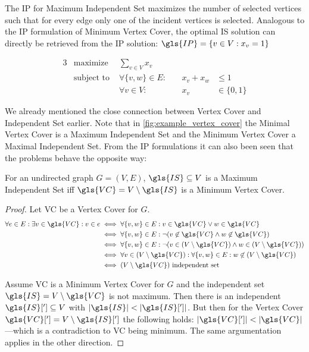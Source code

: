 The \gls{IP} for Maximum Independent Set maximizes the number of 
selected vertices such that for every edge only one of the incident 
vertices is selected. Analogous to the \gls{IP} formulation of Minimum
Vertex Cover, the optimal \gls{IS} solution can directly be retrieved 
from the \gls{IP} solution:
\( \gls{IP} = \{v \in V : x_v = 1\} \)

\begin{problem}
  \begin{alignat*}{3}
    &\text{maximize } & \sum\limits_{v \in V} x_v \\
    &\text{subject to } & \forall \{v,w\} \in E : &~& x_v + x_w &\leq 1 \\
    && \forall v \in V : &~& x_v &\in \{0,1\}
  \end{alignat*}
\end{problem}

We already mentioned the close connection between Vertex Cover and
Independent Set earlier. Note that in \cref{fig:example_vertex_cover}
the Minimal Vertex Cover is a Maximum Independent Set and the Minimum
Vertex Cover a Maximal Independent Set. From the \gls{IP} formulations
 it can also been seen that the problems behave the opposite way:

\begin{theorem}
  \label{thm:independent_set_vertex_cover}
  For an undirected graph \(G=(V,E)\), \(\gls{IS} \subseteq V\)
  is a Maximum Independent Set iff
  \(\gls{VC} = V \setminus \gls{IS}\)
  is a Minimum Vertex Cover.
\end{theorem}

\begin{proof}
  Let \gls{VC} be a Vertex Cover for \(G\). 
  \begin{alignat*}{1}
    \forall e \in E : \exists v \in \gls{VC} : v \in e
    &\iff \forall \{v,w\} \in E :
      v \in \gls{VC} \lor w \in \gls{VC} \\
    &\iff \forall \{v, w\} \in E :
      \lnot(v \not\in \gls{VC} \land w \not\in \gls{VC}) \\
    &\iff \forall \{v, w\} \in E :
      \lnot(v \in (V \setminus \gls{VC})
        \land w \in (V \setminus \gls{VC})) \\
    &\iff \forall v \in (V \setminus \gls{VC}) :
      \forall \{v, w\} \in E :
      w \not\in (V \setminus \gls{VC}) \\
    &\iff (V \setminus \gls{VC}) \text{ independent set}
  \end{alignat*}
  
  Assume \gls{VC} is a Minimum Vertex Cover for \(G\) and the
  independent set \(\gls{IS} = V \setminus \gls{VC}\) is not maximum.
  Then there is an independent \(\gls{IS}['] \subseteq V\) with
  \(|\gls{IS}| < |\gls{IS}[']|\). But then for the Vertex Cover
  \(\gls{VC}['] = V \setminus \gls{IS}[']\) the following holds:
  \(|\gls{VC}[']| < |\gls{VC}|\)---which is a contradiction to
  \gls{VC} being minimum. The same argumentation applies in the other
  direction.
\end{proof}

